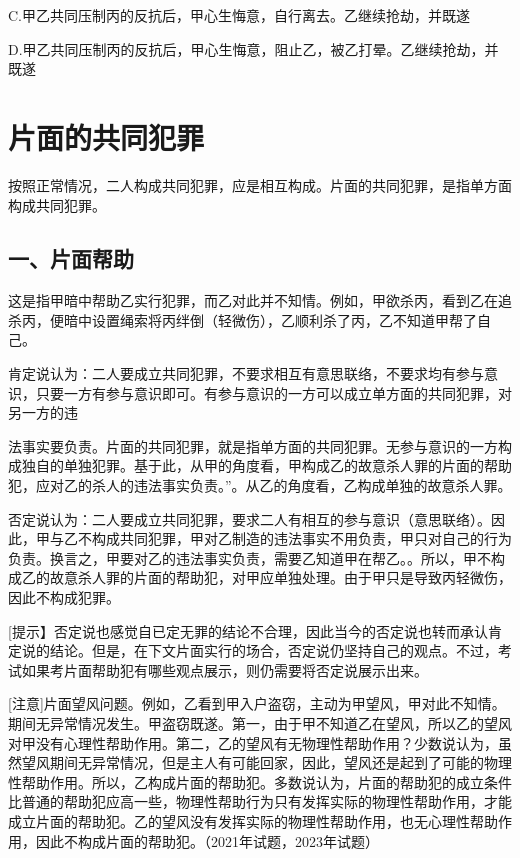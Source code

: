 C.甲乙共同压制丙的反抗后，甲心生悔意，自行离去。乙继续抢劫，并既遂

D.甲乙共同压制丙的反抗后，甲心生悔意，阻止乙，被乙打晕。乙继续抢劫，并既遂

\section{片面的共同犯罪}

按照正常情况，二人构成共同犯罪，应是相互构成。片面的共同犯罪，是指单方面构成共同犯罪。

\subsection*{一、片面帮助}

这是指甲暗中帮助乙实行犯罪，而乙对此并不知情。例如，甲欲杀丙，看到乙在追杀丙，便暗中设置绳索将丙绊倒（轻微伤），乙顺利杀了丙，乙不知道甲帮了自己。

肯定说认为：二人要成立共同犯罪，不要求相互有意思联络，不要求均有参与意识，只要一方有参与意识即可。有参与意识的一方可以成立单方面的共同犯罪，对另一方的违

法事实要负责。片面的共同犯罪，就是指单方面的共同犯罪。无参与意识的一方构成独自的单独犯罪。基于此，从甲的角度看，甲构成乙的故意杀人罪的片面的帮助犯，应对乙的杀人的违法事实负责。”。从乙的角度看，乙构成单独的故意杀人罪。

否定说认为：二人要成立共同犯罪，要求二人有相互的参与意识（意思联络）。因此，甲与乙不构成共同犯罪，甲对乙制造的违法事实不用负责，甲只对自己的行为负责。换言之，甲要对乙的违法事实负责，需要乙知道甲在帮乙。。所以，甲不构成乙的故意杀人罪的片面的帮助犯，对甲应单独处理。由于甲只是导致丙轻微伤，因此不构成犯罪。

[提示】否定说也感觉自已定无罪的结论不合理，因此当今的否定说也转而承认肯定说的结论。但是，在下文片面实行的场合，否定说仍坚持自己的观点。不过，考试如果考片面帮助犯有哪些观点展示，则仍需要将否定说展示出来。

[注意]片面望风问题。例如，乙看到甲入户盗窃，主动为甲望风，甲对此不知情。期间无异常情况发生。甲盗窃既遂。第一，由于甲不知道乙在望风，所以乙的望风对甲没有心理性帮助作用。第二，乙的望风有无物理性帮助作用？少数说认为，虽然望风期间无异常情况，但是主人有可能回家，因此，望风还是起到了可能的物理性帮助作用。所以，乙构成片面的帮助犯。多数说认为，片面的帮助犯的成立条件比普通的帮助犯应高一些，物理性帮助行为只有发挥实际的物理性帮助作用，才能成立片面的帮助犯。乙的望风没有发挥实际的物理性帮助作用，也无心理性帮助作用，因此不构成片面的帮助犯。（2021年试题，2023年试题）

